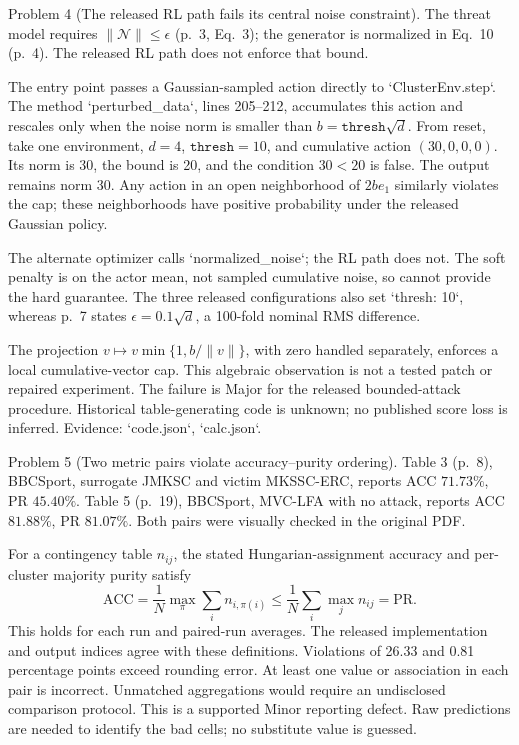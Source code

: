 \documentclass[10pt]{article}
\begin{document}
Problem 4 (The released RL path fails its central noise constraint).  The threat model requires \(\|\mathcal N\|\leq\epsilon\) (p. 3, Eq. 3); the generator is normalized in Eq. 10 (p. 4). The released RL path does not enforce that bound.\par
The entry point passes a Gaussian-sampled action directly to `ClusterEnv.step`. The method `perturbed\_data`, lines 205–212, accumulates this action and rescales only when the noise norm is smaller than \(b=\texttt{thresh}\sqrt d\). From reset, take one environment, \(d=4\), \(\texttt{thresh}=10\), and cumulative action \((30,0,0,0)\). Its norm is 30, the bound is 20, and the condition \(30<20\) is false. The output remains norm 30. Any action in an open neighborhood of \(2b e_1\) similarly violates the cap; these neighborhoods have positive probability under the released Gaussian policy.\par
The alternate optimizer calls `normalized\_noise`; the RL path does not. The soft penalty is on the actor mean, not sampled cumulative noise, so cannot provide the hard guarantee. The three released configurations also set `thresh: 10`, whereas p. 7 states \(\epsilon=0.1\sqrt d\), a 100-fold nominal RMS difference.\par
The projection \(v\mapsto v\min\{1,b/\|v\|\}\), with zero handled separately, enforces a local cumulative-vector cap. This algebraic observation is not a tested patch or repaired experiment. The failure is Major for the released bounded-attack procedure. Historical table-generating code is unknown; no published score loss is inferred. Evidence: `code.json`, `calc.json`.\par
Problem 5 (Two metric pairs violate accuracy–purity ordering).  Table 3 (p. 8), BBCSport, surrogate JMKSC and victim MKSSC-ERC, reports ACC \(71.73\%\), PR \(45.40\%\). Table 5 (p. 19), BBCSport, MVC-LFA with no attack, reports ACC \(81.88\%\), PR \(81.07\%\). Both pairs were visually checked in the original PDF.\par
For a contingency table \(n_{ij}\), the stated Hungarian-assignment accuracy and per-cluster majority purity satisfy \[\mathrm{ACC}=\frac1N\max_\pi\sum_i n_{i,\pi(i)}
 \leq\frac1N\sum_i\max_j n_{ij}=\mathrm{PR}.\] This holds for each run and paired-run averages. The released implementation and output indices agree with these definitions. Violations of 26.33 and 0.81 percentage points exceed rounding error. At least one value or association in each pair is incorrect. Unmatched aggregations would require an undisclosed comparison protocol. This is a supported Minor reporting defect. Raw predictions are needed to identify the bad cells; no substitute value is guessed.\par
\end{document}
